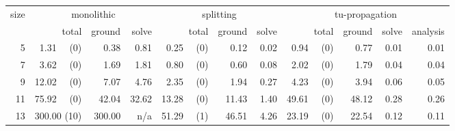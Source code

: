 \documentclass[11pt,fleqn,twoside]{article}
\begin{document}
			\begin{table}[t]
				\small
				\centering
				\setlength\tabcolsep{1.5pt}
				\begin{tabular}[t]{|r|r|r|r|r|r|r|r|r|r|r|}
					\hline
					size & \multicolumn{3}{c|}{monolithic} & \multicolumn{3}{c|}{splitting} & \multicolumn{4}{c|}{tu-propagation} \\
					& total & ground & solve & total & ground & solve & total & ground & solve & analysis \\
					\hline
5      & 1.31 ~~(0) & 0.38     & 0.81     & 0.25 ~~(0) & 0.12     & 0.02     & 0.94 ~~(0) & 0.77     & 0.01     & 0.01     \\
7      & 3.62 ~~(0) & 1.69     & 1.81     & 0.80 ~~(0) & 0.60     & 0.08     & 2.02 ~~(0) & 1.79     & 0.04     & 0.04     \\
9      & 12.02 ~~(0) & 7.07     & 4.76     & 2.35 ~~(0) & 1.94     & 0.27     & 4.23 ~~(0) & 3.94     & 0.06     & 0.05     \\
11      & 75.92 ~~(0) & 42.04     & 32.62     & 13.28 ~~(0) & 11.43     & 1.40     & 49.61 ~~(0) & 48.12     & 0.28     & 0.26     \\
13      & 300.00 (10) & 300.00     & n/a    & 51.29 ~~(1) & 46.51     & 4.26     & 23.19 ~~(0) & 22.54     & 0.12     & 0.11     \\

\end{tabular}
\end{table}
\end{document}
